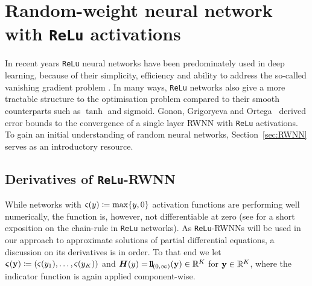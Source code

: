 \section{Random-weight neural network with \texttt{ReLu} activations}\label{sec:ReLu-RWNN}

In recent years \texttt{ReLu} neural networks have been predominately used in deep learning, because of their simplicity, efficiency and ability to address the so-called vanishing gradient problem \cite{LeCun2012EfficientBackProp}. In many ways, \texttt{ReLu} networks also give a more tractable structure to the optimisation problem compared to their smooth counterparts such as $\tanh$ and sigmoid. 
Gonon, Grigoryeva and Ortega~\cite{Gonon2020ApproximationSystems} derived error bounds to the convergence of a single layer RWNN with \texttt{ReLu} activations. 
To gain an initial understanding of random neural networks, Section~\ref{sec:RWNN} serves as an introductory resource.

\subsection{Derivatives of \texttt{ReLu}-RWNN}
\label{sec:RWNNderivatives}
While networks with ${\varsigma(y)\coloneqq \max\{y,0\}}$ activation functions are performing well numerically, the function is, however, not differentiable at zero (see \cite{Berner2019TowardsEstimates} for a short exposition on the chain-rule in \texttt{ReLu} networks). As \texttt{ReLu}-RWNNs will be used in our approach to approximate solutions of partial differential equations, a discussion on its derivatives is in order. 
To that end we let $\operatorname{\boldsymbol\varsigma}(\mathbf{y})\coloneqq(\varsigma(y_1),\dots,\varsigma(y_K))$ and $\Hb(y)=\ind_{(0,\infty)}(\yybf)\in\RR^K$ for $\mathbf{y}\in\mathbb{R}^K$, where the indicator function is again applied component-wise. 


